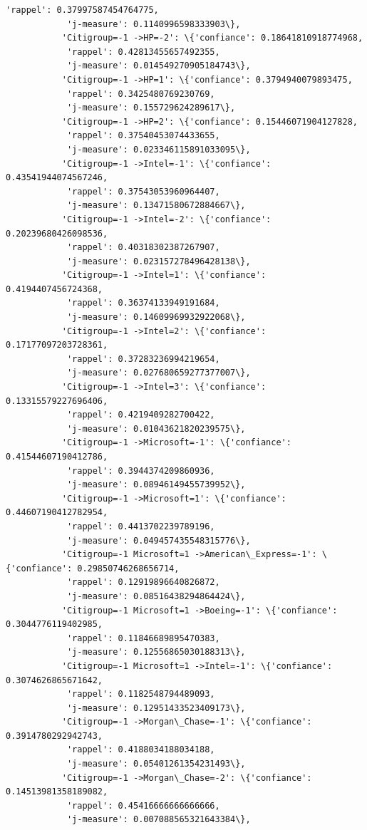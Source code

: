 \documentclass[11pt]{article}
\begin{document}
\begin{Verbatim}[commandchars=\\\{\}]
            'rappel': 0.37997587454764775,
            'j-measure': 0.1140996598333903\},
           'Citigroup=-1 ->HP=-2': \{'confiance': 0.18641810918774968,
            'rappel': 0.42813455657492355,
            'j-measure': 0.014549270905184743\},
           'Citigroup=-1 ->HP=1': \{'confiance': 0.3794940079893475,
            'rappel': 0.3425480769230769,
            'j-measure': 0.155729624289617\},
           'Citigroup=-1 ->HP=2': \{'confiance': 0.15446071904127828,
            'rappel': 0.37540453074433655,
            'j-measure': 0.023346115891033095\},
           'Citigroup=-1 ->Intel=-1': \{'confiance': 0.43541944074567246,
            'rappel': 0.37543053960964407,
            'j-measure': 0.13471580672884667\},
           'Citigroup=-1 ->Intel=-2': \{'confiance': 0.20239680426098536,
            'rappel': 0.40318302387267907,
            'j-measure': 0.023157278496428138\},
           'Citigroup=-1 ->Intel=1': \{'confiance': 0.4194407456724368,
            'rappel': 0.36374133949191684,
            'j-measure': 0.14609969932922068\},
           'Citigroup=-1 ->Intel=2': \{'confiance': 0.17177097203728361,
            'rappel': 0.37283236994219654,
            'j-measure': 0.027680659277377007\},
           'Citigroup=-1 ->Intel=3': \{'confiance': 0.13315579227696406,
            'rappel': 0.4219409282700422,
            'j-measure': 0.01043621820239575\},
           'Citigroup=-1 ->Microsoft=-1': \{'confiance': 0.41544607190412786,
            'rappel': 0.3944374209860936,
            'j-measure': 0.08946149455739952\},
           'Citigroup=-1 ->Microsoft=1': \{'confiance': 0.44607190412782954,
            'rappel': 0.4413702239789196,
            'j-measure': 0.049457435548315776\},
           'Citigroup=-1 Microsoft=1 ->American\_Express=-1': \{'confiance': 0.29850746268656714,
            'rappel': 0.12919896640826872,
            'j-measure': 0.08516438294864424\},
           'Citigroup=-1 Microsoft=1 ->Boeing=-1': \{'confiance': 0.3044776119402985,
            'rappel': 0.11846689895470383,
            'j-measure': 0.12556865030188313\},
           'Citigroup=-1 Microsoft=1 ->Intel=-1': \{'confiance': 0.3074626865671642,
            'rappel': 0.1182548794489093,
            'j-measure': 0.12951433523409173\},
           'Citigroup=-1 ->Morgan\_Chase=-1': \{'confiance': 0.3914780292942743,
            'rappel': 0.4188034188034188,
            'j-measure': 0.05401261354231493\},
           'Citigroup=-1 ->Morgan\_Chase=-2': \{'confiance': 0.14513981358189082,
            'rappel': 0.45416666666666666,
            'j-measure': 0.007088565321643384\},

\end{Verbatim}
\end{document}
